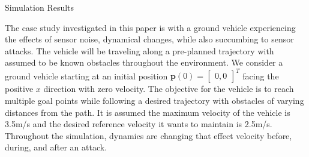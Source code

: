 
\begin{section}{Simulation Results}
\label{sec:simulation}


The case study investigated in this paper is with a ground vehicle experiencing the effects of sensor noise, dynamical changes, while also succumbing to sensor attacks. The vehicle will be traveling along a pre-planned trajectory with assumed to be known obstacles throughout the environment. We consider a ground vehicle starting at an initial position $\bm{p}(0)=\begin{bmatrix} 0,0 \end{bmatrix}^T$ facing the positive $x$ direction with zero velocity. The objective for the vehicle is to reach multiple goal points while following a desired trajectory with obstacles of varying distances from the path. It is assumed the maximum velocity of the vehicle is 3.5m/s and the desired reference velocity it wants to maintain is 2.5m/s. Throughout the simulation, dynamics are changing that effect velocity before, during, and after an attack. 




\begin{figure}[b!th]
\begin{tabular}{ccc}


\end{tabular}
\end{figure}
\end{section}
